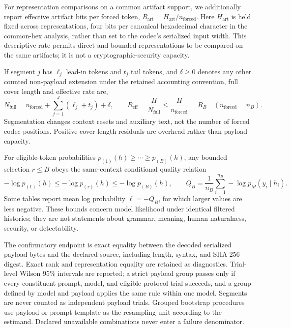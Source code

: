 \documentclass[fleqn,10pt]{wlscirep}
\begin{document}
For representation comparisons on a common artifact support, we additionally report effective artifact bits per forced token, \(R_{\mathrm{art}}=H_{\mathrm{art}}/n_{\mathrm{forced}}\). Here \(H_{\mathrm{art}}\) is held fixed across representations, four bits per canonical hexadecimal character in the common-hex analysis, rather than set to the codec's serialized input width. This descriptive rate permits direct and bounded representations to be compared on the same artifacts; it is not a cryptographic-security capacity.

If segment \(j\) has \(\ell_j\) lead-in tokens and \(t_j\) tail tokens, and \(\delta\ge0\) denotes any other counted non-payload extension under the retained accounting convention, full cover length and effective rate are,
\begin{equation}
N_{\mathrm{full}}
=n_{\mathrm{forced}}+\sum_{j=1}^{J}(\ell_j+t_j)+\delta,
\qquad
R_{\mathrm{eff}}=\frac{H}{N_{\mathrm{full}}}
\le\frac{H}{n_{\mathrm{forced}}}=R_B
\quad(n_{\mathrm{forced}}=n_B).
\label{eq:effective-rate}
\end{equation}
Segmentation changes context resets and auxiliary text, not the number of forced codec positions. Positive cover-length residuals are overhead rather than payload capacity.

For eligible-token probabilities \(p_{(1)}(h)\ge\cdots\ge p_{(B)}(h)\), any bounded selection \(r\le B\) obeys the same-context conditional quality relation
\begin{equation}
-\log p_{(1)}(h)
\le-\log p_{(r)}(h)
\le-\log p_{(B)}(h),\qquad
Q_B=\frac{1}{n_B}\sum_{i=1}^{n_B}-\log p_M(y_i\mid h_i).
\label{eq:quality-bound}
\end{equation}
Some tables report mean log probability \(\bar\ell=-Q_B\), for which larger values are less negative. These bounds concern model likelihood under identical filtered histories; they are not statements about grammar, meaning, human naturalness, security, or detectability.

The confirmatory endpoint is exact equality between the decoded serialized payload bytes and the declared source, including length, syntax, and SHA-256 digest. Exact rank and representation equality are retained as diagnostics. Trial-level Wilson 95\% intervals are reported\cite{Wilson1927Interval}; a strict payload group passes only if every constituent prompt, model, and eligible protocol trial succeeds, and a group defined by model and payload applies the same rule within one model. Segments are never counted as independent payload trials. Grouped bootstrap procedures use payload or prompt template as the resampling unit according to the estimand. Declared unavailable combinations never enter a failure denominator.
\end{document}
